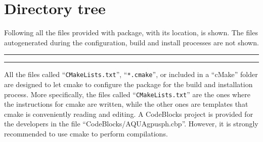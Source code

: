 \chapter{Directory tree}
%
Following all the files provided with \NAME package, with its location, is 
shown.
%
The files autogenerated during the configuration, build and install processes 
are not shown.

\vspace{0.5cm}
\rule{\textwidth}{1pt}
\vspace{0.5cm}

\vspace{0.5cm}
\rule{\textwidth}{1pt}
\vspace{0.5cm}

All the files called ``\texttt{CMakeLists.txt}'', ``\texttt{*.cmake}'', or 
included in a ``cMake'' folder are designed to let cmake to configure the 
package for the build and installation process.
%
More specifically, the files called ``\texttt{CMakeLists.txt}'' are the ones 
where the instructions for cmake are written, while the other ones are 
templates that cmake is conveniently reading and editing.\rc
%
A CodeBlocks project is provided for the developers in the file 
``CodeBlocks/AQUAgpusph.cbp''.
%
However, it is strongly recommended to use cmake to perform compilations.
%